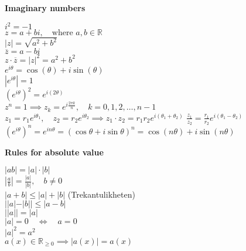 \documentclass[a4paper,11pt]{article}
\renewcommand{\textbf}[1]{{\scriptsize	\bfseries #1}}
\begin{document}
\begin{footnotesize}
\begin{multicols}{2}
\begin{minipage}{\linewidth}
\end{minipage}
\begin{minipage}{\linewidth}

\textbf{Imaginary numbers}

\( i^2 = -1 \) \\ 
\( z = a + bi, \quad \text{where } a, b \in \mathbb{R} \) \\
\( |z| = \sqrt{a^2 + b^2} \) \\
\( \overline{z} = a - bi \) \\
\( z \cdot \overline{z} = |z|^2 = a^2 + b^2 \) \\
\( e^{i\theta} = \cos(\theta) + i\sin(\theta) \) \\
\( |e^{i\theta}| = 1 \) \\
\( \left(e^{i\theta}\right)^2 = e^{i(2\theta)} \) \\
\( z^n = 1 \implies z_k = e^{i\frac{2\pi k}{n}}, \quad k = 0, 1, 2, \dots, n-1 \) \\
\( z_1 = r_1 e^{i\theta_1}, \quad z_2 = r_2 e^{i\theta_2} \implies
z_1 \cdot z_2 = r_1 r_2 e^{i(\theta_1 + \theta_2)} \)
\( \frac{z_1}{z_2} = \frac{r_1}{r_2} e^{i(\theta_1 - \theta_2)} \) \\
\( \left(e^{i\theta}\right)^n = e^{i n \theta} = (\cos\theta + i\sin\theta)^n = \cos(n\theta) + i\sin(n\theta) \) \\

\end{minipage}
\begin{minipage}{\linewidth}

\textbf{Rules for absolute value} 

\(|ab| = |a| \cdot |b|\)\\
\(\left| \frac{a}{b} \right| = \frac{|a|}{|b|}, \quad b \neq 0\)\\
\(|a + b| \leq |a| + |b|\)  (Trekantulikheten)\\
\(||a| - |b|| \leq |a - b|\)\\
\(||a|| = |a|\)\\
\(|a| = 0 \quad \Leftrightarrow \quad a = 0\)\\
\(|a|^2 = a^2\)\\
\(a(x) \in \mathbb{R}_{\geq 0} \implies |a(x)| = a(x)\)\\

\end{minipage}


\begin{minipage}{\linewidth}

\end{minipage}
\end{multicols}
\end{footnotesize}
\end{document}
